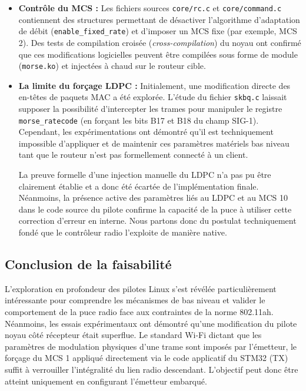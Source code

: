 \begin{itemize}
    \item \textbf{Contrôle du MCS :} Les fichiers sources \texttt{core/rc.c} et \texttt{core/command.c} contiennent 
    des structures permettant de désactiver l'algorithme d'adaptation de débit \newline  
    (\texttt{enable\_fixed\_rate}) et d'imposer un MCS fixe (par exemple, MCS 2). Des tests de 
    compilation croisée (\textit{cross-compilation}) du noyau ont confirmé que ces modifications 
    logicielles peuvent être compilées sous forme de module (\texttt{morse.ko}) et injectées à 
    chaud sur le routeur cible.
    \item \textbf{La limite du forçage LDPC :} Initialement, une modification directe des en-têtes de 
    paquets MAC a été explorée. L'étude du fichier \texttt{skbq.c} laissait supposer la possibilité 
    d'intercepter les trames pour manipuler le registre \texttt{morse\_ratecode} 
    (en forçant les bits B17 et B18 du champ SIG-1). Cependant, les expérimentations ont démontré qu'il 
    est techniquement impossible d'appliquer et de maintenir ces paramètres matériels bas niveau tant 
    que le routeur n'est pas formellement connecté à un client.
    
    La preuve formelle d'une injection manuelle du LDPC n'a pas pu être clairement établie
    et a donc été écartée de l'implémentation finale. 
    Néanmoins, la présence active des paramètres liés au LDPC et au MCS 10 dans le code source du pilote 
    confirme la capacité de la puce à utiliser cette correction d'erreur en interne. Nous partons donc 
    du postulat techniquement fondé que le contrôleur radio l'exploite de manière native.
\end{itemize}


\subsection{Conclusion de la faisabilité}
L'exploration en profondeur des pilotes Linux s'est révélée particulièrement intéressante pour comprendre les mécanismes 
de bas niveau et valider le comportement de la puce radio face aux contraintes de la norme 802.11ah. Néanmoins, les essais 
expérimentaux ont démontré qu'une modification du pilote noyau côté récepteur était superflue. Le standard 
Wi-Fi dictant que les paramètres de modulation physiques d'une trame sont imposés par l'émetteur, le forçage du 
MCS 1 appliqué directement via le code applicatif du STM32 (TX) suffit à verrouiller l'intégralité 
du lien radio descendant. L'objectif peut donc être atteint uniquement en configurant l'émetteur embarqué.